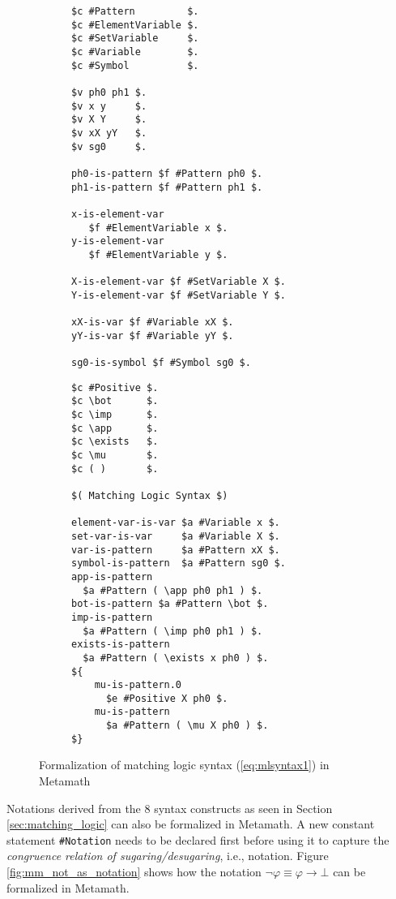 \documentclass{article}
\theoremstyle{plain}
\theoremstyle{definition}
\newcommand{\imp}{\to}
\begin{document}
\begin{figure}[!h]
\begin{subfigure}[t]{0.5\textwidth}
\begin{lstlisting}[language=Metamath]
$c #Pattern         $.
$c #ElementVariable $.
$c #SetVariable     $.
$c #Variable        $.
$c #Symbol          $.

$v ph0 ph1 $.
$v x y     $.
$v X Y     $.
$v xX yY   $.
$v sg0     $.

ph0-is-pattern $f #Pattern ph0 $.
ph1-is-pattern $f #Pattern ph1 $.

x-is-element-var 
   $f #ElementVariable x $.
y-is-element-var 
   $f #ElementVariable y $.

X-is-element-var $f #SetVariable X $.
Y-is-element-var $f #SetVariable Y $.

xX-is-var $f #Variable xX $.
yY-is-var $f #Variable yY $.

sg0-is-symbol $f #Symbol sg0 $.
\end{lstlisting}
\end{subfigure}
\begin{subfigure}[t]{0.7\textwidth}
\begin{lstlisting}[language=Metamath]
$c #Positive $.
$c \bot      $.
$c \imp      $.
$c \app      $.
$c \exists   $.
$c \mu       $.
$c ( )       $.

$( Matching Logic Syntax $)

element-var-is-var $a #Variable x $.
set-var-is-var     $a #Variable X $.
var-is-pattern     $a #Pattern xX $.
symbol-is-pattern  $a #Pattern sg0 $.
app-is-pattern 
  $a #Pattern ( \app ph0 ph1 ) $.
bot-is-pattern $a #Pattern \bot $.
imp-is-pattern 
  $a #Pattern ( \imp ph0 ph1 ) $.
exists-is-pattern 
  $a #Pattern ( \exists x ph0 ) $.
${ 
    mu-is-pattern.0 
      $e #Positive X ph0 $.
    mu-is-pattern   
      $a #Pattern ( \mu X ph0 ) $.
$}
\end{lstlisting}
\end{subfigure}
\caption{Formalization of matching logic syntax (\ref{eq:mlsyntax1}) in Metamath}
\label{fig:mm_ml_syntax}
\end{figure}

Notations derived from the 8 syntax constructs as seen in Section \ref{sec:matching_logic} can also be formalized in Metamath. A new constant statement \lstinline{#Notation} needs to be declared first before using it to capture the \textit{congruence relation of sugaring/desugaring}, i.e., notation. Figure \ref{fig:mm_not_as_notation} shows how the notation $\neg \varphi \equiv \varphi \imp \bot$ can be formalized in Metamath.
\end{document}
